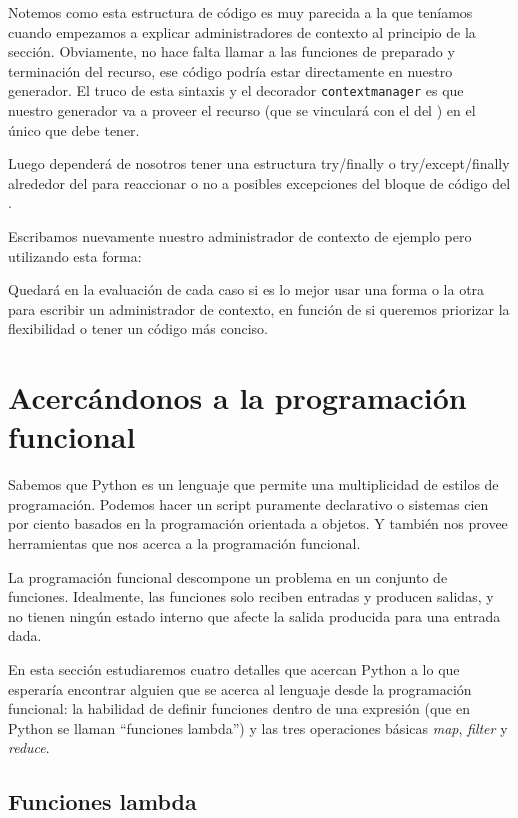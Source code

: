 Notemos como esta estructura de código es muy parecida a la que teníamos cuando empezamos a explicar administradores de contexto al principio de la sección. Obviamente, no hace falta llamar a las funciones de preparado y terminación del recurso, ese código podría estar directamente en nuestro generador. El truco de esta sintaxis y el decorador \texttt{contextmanager} es que nuestro generador va a proveer el recurso (que se vinculará con el  del ) en el único  que debe tener.

Luego dependerá de nosotros tener una estructura try/finally o try/except/finally alrededor del  para reaccionar o no a posibles excepciones del bloque de código del .

Escribamos nuevamente nuestro administrador de contexto de ejemplo pero utilizando esta forma:


Quedará en la evaluación de cada caso si es lo mejor usar una forma o la otra para escribir un administrador de contexto, en función de si queremos priorizar la flexibilidad o tener un código más conciso.


\section{Acercándonos a la programación funcional}

Sabemos que Python es un lenguaje que permite una multiplicidad de estilos de programación. Podemos hacer un script puramente declarativo o sistemas cien por ciento basados en la programación orientada a objetos. Y también nos provee herramientas que nos acerca a la programación funcional.

La programación funcional descompone un problema en un conjunto de funciones. Idealmente, las funciones solo reciben entradas y producen salidas, y no tienen ningún estado interno que afecte la salida producida para una entrada dada.

En esta sección estudiaremos cuatro detalles que acercan Python a lo que esperaría encontrar alguien que se acerca al lenguaje desde la programación funcional: la habilidad de definir funciones dentro de una expresión (que en Python se llaman ``funciones lambda'') y las tres operaciones básicas \textit{map}, \textit{filter} y \textit{reduce}.

\subsection{Funciones lambda}

